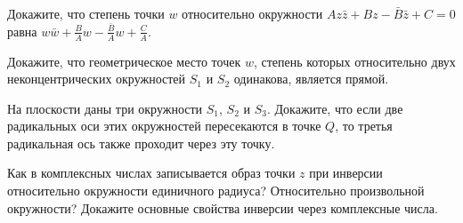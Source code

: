 \documentclass[a4paper, 12pt, num=23]{listok}
\begin{document}
\begin{problem}
	Докажите, что степень точки $w$ относительно окружности $Az\bar z + Bz - \bar B \bar z + C = 0$ равна
	$w\bar w + \frac B A w - \frac{\bar B}A w + \frac C A$.
\end{problem}
\begin{problem}
	Докажите, что геометрическое место точек $w$, степень которых относительно двух неконцентрических окружностей $S_1$ и $S_2$ одинакова, является прямой.
\end{problem}
\begin{problem}
	На плоскости даны три окружности $S_1$, $S_2$ и $S_3$.
	Докажите, что если две радикальных оси этих окружностей пересекаются в точке $Q$, то третья радикальная ось также проходит через эту точку.
\end{problem}
\begin{problem}
	Как в комплексных числах записывается образ точки $z$ при инверсии относительно окружности единичного радиуса?
	Относительно произвольной окружности? Докажите основные свойства инверсии через комплексные числа.
\end{problem}
\end{document}
